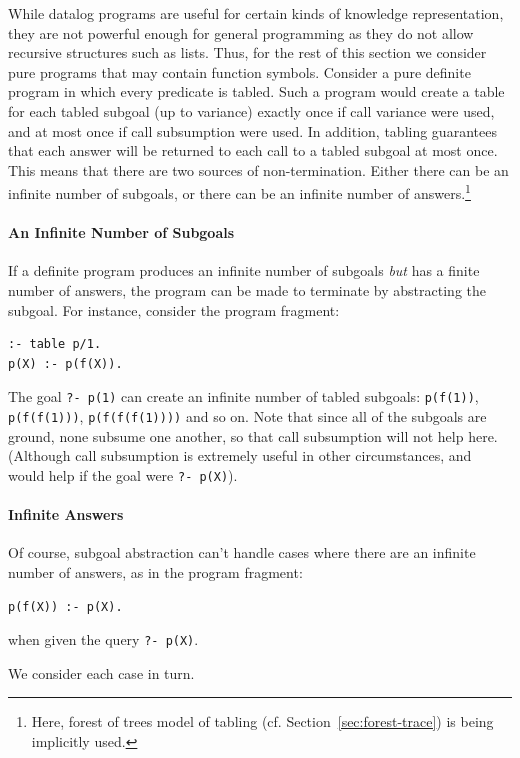 While datalog programs are useful for certain kinds of knowledge
representation, they are not powerful enough for general programming
as they do not allow recursive structures such as lists.  Thus, for
the rest of this section we consider pure programs that may contain
function symbols.  Consider a pure definite program in which every
predicate is tabled.  Such a program would create a table for each
tabled subgoal (up to variance) exactly once if call variance were
used, and at most once if call subsumption were used.  In addition,
tabling guarantees that each answer will be returned to each call to a
tabled subgoal at most once.  This means that there are two sources of
non-termination.  Either there can be an infinite number of subgoals,
or there can be an infinite number of answers.\footnote{Here, forest
  of trees model of tabling (cf. Section~\ref{sec:forest-trace}) is
  being implicitly used.}

\paragraph{An Infinite Number of Subgoals}
%
If a definite program produces an infinite number of subgoals {\em
  but} has a finite number of answers, the program can be made to
terminate by abstracting the subgoal.  For instance, consider the
program fragment:
%
\begin{verbatim}
:- table p/1.
p(X) :- p(f(X)).
\end{verbatim}
%
The goal {\tt ?- p(1)} can create an infinite number of tabled
subgoals: {\tt p(f(1))}, {\tt p(f(f(1)))}, {\tt p(f(f(f(1))))} and so
on.  Note that since all of the subgoals are ground, none subsume one
another, so that call subsumption will not help here. (Although call
subsumption is extremely useful in other circumstances, and would help
if the goal were {\tt ?- p(X)}).

\paragraph*{Infinite Answers}
%
Of course, subgoal abstraction can't handle cases where there are an
infinite number of answers, as in the program fragment:
%
\begin{verbatim}
p(f(X)) :- p(X).
\end{verbatim}
%
when given the query {\tt ?- p(X)}.  

We consider each case in turn.

